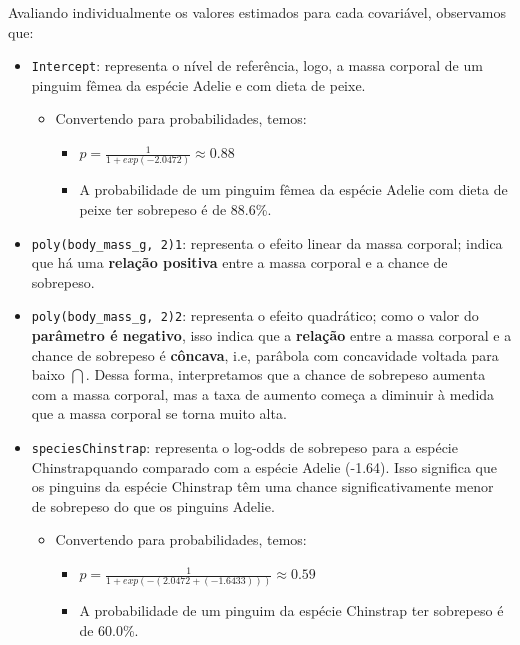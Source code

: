 \documentclass[
]{book}
\providecommand{\tightlist}{%
  \setlength{\itemsep}{0pt}\setlength{\parskip}{0pt}}
\begin{document}
Avaliando individualmente os valores estimados para cada covariável, observamos que:

\begin{itemize}
\tightlist
\item
  \texttt{Intercept}: representa o nível de referência, logo, a massa corporal de um pinguim fêmea da espécie Adelie e com dieta de peixe.

  \begin{itemize}
  \tightlist
  \item
    Convertendo para probabilidades, temos:

    \begin{itemize}
    \tightlist
    \item
      \(p = \frac{1}{1+exp(-2.0472)}  \approx 0.88\)
    \item
      A probabilidade de um pinguim fêmea da espécie Adelie com dieta de peixe ter sobrepeso é de 88.6\%.
    \end{itemize}
  \end{itemize}
\end{itemize}

\begin{itemize}
\tightlist
\item
  \texttt{poly(body\_mass\_g,\ 2)1}: representa o efeito linear da massa corporal; indica que há uma \textbf{relação positiva} entre a massa corporal e a chance de sobrepeso.
\end{itemize}

\begin{itemize}
\tightlist
\item
  \texttt{poly(body\_mass\_g,\ 2)2}: representa o efeito quadrático; como o valor do \textbf{parâmetro é negativo}, isso indica que a \textbf{relação} entre a massa corporal e a chance de sobrepeso é \textbf{côncava}, i.e, parâbola com concavidade voltada para baixo \(\bigcap\). Dessa forma, interpretamos que a chance de sobrepeso aumenta com a massa corporal, mas a taxa de aumento começa a diminuir à medida que a massa corporal se torna muito alta.
\end{itemize}

\begin{itemize}
\tightlist
\item
  \texttt{speciesChinstrap}: representa o log-odds de sobrepeso para a espécie Chinstrapquando comparado com a espécie Adelie (-1.64). Isso significa que os pinguins da espécie Chinstrap têm uma chance significativamente menor de sobrepeso do que os pinguins Adelie.

  \begin{itemize}
  \tightlist
  \item
    Convertendo para probabilidades, temos:

    \begin{itemize}
    \tightlist
    \item
      \(p = \frac{1}{1+exp(-(2.0472 + (-1.6433)))}  \approx 0.59\)
    \item
      A probabilidade de um pinguim da espécie Chinstrap ter sobrepeso é de 60.0\%.
    \end{itemize}
  \end{itemize}
\end{itemize}
\end{document}
